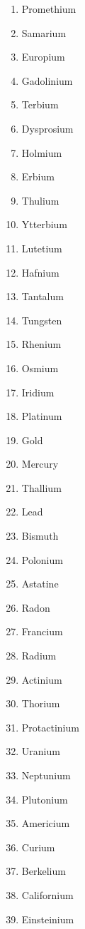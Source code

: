 \begin{enumerate}
    \begin{multicols}{3}
    \begin{enumerate}[label={\thaialphs*.},start=62]
        \item Promethium
        \item Samarium
        \item Europium
        \item Gadolinium
        \item Terbium
        \item Dysprosium
        \item Holmium
        \item Erbium
        \item Thulium
        \item Ytterbium
        \item Lutetium
        \item Hafnium
        \item Tantalum
        \item Tungsten
        \item Rhenium
        \item Osmium
        \item Iridium
        \item Platinum
        \item Gold
        \item Mercury
        \item Thallium
        \item Lead
        \item Bismuth
        \item Polonium
        \item Astatine
        \item Radon
        \item Francium
        \item Radium
        \item Actinium
        \item Thorium
        \item Protactinium
        \item Uranium
        \item Neptunium
        \item Plutonium
        \item Americium
        \item Curium
        \item Berkelium
        \item Californium
        \item Einsteinium

\end{enumerate}
\end{multicols}
\end{enumerate}
